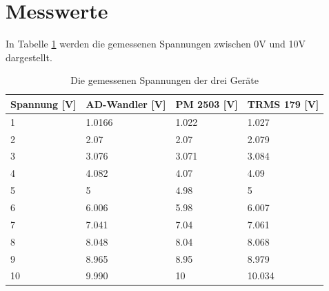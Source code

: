 \documentclass[12pt, oneside, a4paper, \docLanguage]{report}
\begin{document}
\newpage
\section{Messwerte}
\label{chap:VERSUCH_1_MESSWERTE}

In Tabelle \ref{fig:VERSUCH_1_messungen} werden die gemessenen Spannungen zwischen 0V und 10V dargestellt.

\begin{table}[H]
\centering
\begin{tabular}{|l|l|l|l|}
\hline
\multicolumn{1}{|c|}{\textbf{Spannung {[}V{]}}} & \textbf{AD-Wandler {[}V{]}} & \textbf{PM 2503 {[}V{]}} & \textbf{TRMS 179 {[}V{]}} \\ \hline
1                                               & 1.0166                      & 1.022                    & 1.027             \\ \hline
2                                               & 2.07                        & 2.07                     & 2.079             \\ \hline
3                                               & 3.076                       & 3.071                    & 3.084             \\ \hline
4                                               & 4.082                       & 4.07                     & 4.09              \\ \hline
5                                               & 5                           & 4.98                     & 5                 \\ \hline
6                                               & 6.006                       & 5.98                     & 6.007             \\ \hline
7                                               & 7.041                       & 7.04                     & 7.061             \\ \hline
8                                               & 8.048                       & 8.04                     & 8.068             \\ \hline
9                                               & 8.965                       & 8.95                     & 8.979             \\ \hline
10                                              & 9.990                       & 10                       & 10.034            \\ \hline
\end{tabular}
\caption{Die gemessenen Spannungen der drei Geräte}
\label{fig:VERSUCH_1_messungen}
\end{table}
\end{document}
